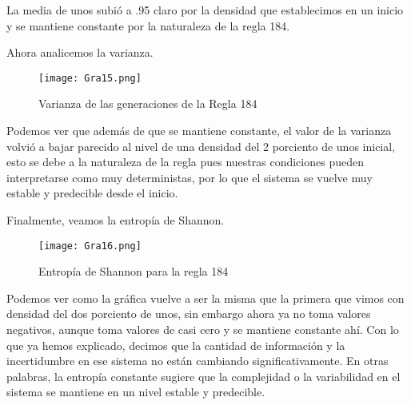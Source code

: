 \documentclass{article}
\begin{document}
\begin{itemize}
		La media de unos subió a .95 claro por la densidad que establecimos en un inicio y se mantiene constante por la naturaleza de la regla 184.
		
		Ahora analicemos la varianza.
		
		\begin{figure}[h]
			\centering       
			\texttt{[image: Gra15.png]}
			\caption{Varianza de las generaciones de la Regla 184}
			\label{fig:mi_imagen1}
		\end{figure}
		\vspace{300pt}
		Podemos ver que además de que se mantiene constante, el valor de la varianza volvió a bajar parecido al nivel de una densidad del 2 porciento de unos inicial, esto se debe a la naturaleza de la regla pues nuestras condiciones pueden interpretarse como muy deterministas, por lo que el sistema se vuelve muy estable y predecible desde el inicio.
		
		Finalmente, veamos la entropía de Shannon.
		
		\begin{figure}[h]
			\centering       
			\texttt{[image: Gra16.png]}
			\caption{Entropía de Shannon para la regla 184}
			\label{fig:mi_imagen1}
		\end{figure}
		
		Podemos ver como la gráfica vuelve a ser la misma que la primera que vimos con densidad del dos porciento de unos, sin embargo ahora ya no toma valores negativos, aunque toma valores de casi cero y se mantiene constante ahí. 
		Con lo que ya hemos explicado, decimos que la cantidad de información y la incertidumbre en ese sistema no están cambiando significativamente. En otras palabras, la entropía constante sugiere que la complejidad o la variabilidad en el sistema se mantiene en un nivel estable y predecible.
	
	\end{itemize}

	
\end{document}
